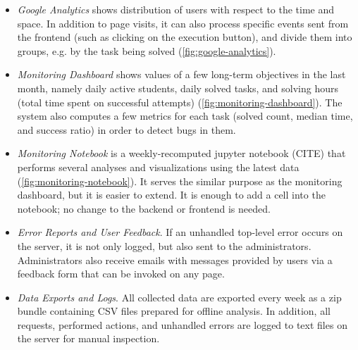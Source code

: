 \begin{itemize}
\item \emph{Google Analytics}
  shows distribution of users with respect to the time and space.
  In addition to page visits,
  it can also process specific events sent from the frontend
  (such as clicking on the execution button),
  and divide them into groups, e.g. by the task being solved
  (\cref{fig:google-analytics}).
\item \emph{Monitoring Dashboard}
  shows values of a few long-term objectives %
  in the last month, namely daily active students, daily solved tasks, and
  solving hours (total time spent on successful attempts)
  (\cref{fig:monitoring-dashboard}).
  The system also computes a few metrics for each task
  (solved count, median time, and success ratio) in order to detect
  bugs in them.
\item \emph{Monitoring Notebook}
  is a weekly-recomputed jupyter notebook (CITE) that performs several analyses
  and visualizations using the latest data (\cref{fig:monitoring-notebook}).
  It serves the similar purpose as the monitoring dashboard, but it is
  easier to extend. It is enough to add a cell into the notebook;
  no change to the backend or frontend is needed.
\item \emph{Error Reports and User Feedback}.
  If an unhandled top-level error occurs on the server,
  it is not only logged, but also sent to the administrators.
  Administrators also receive emails with messages provided by users via
  a feedback form that can be invoked on any page.
\item \emph{Data Exports and Logs}.
  All collected data are exported every week as a zip bundle containing
  CSV files prepared for %
  offline analysis.
  In addition, all requests, performed actions, and unhandled errors %
  are logged to text files on the server for manual inspection.
\end{itemize}



